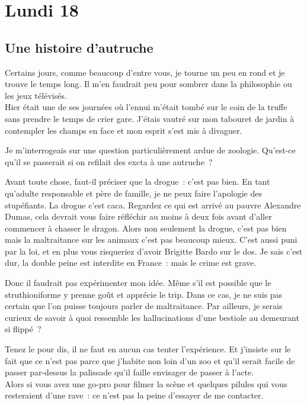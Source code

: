 ﻿\section*{Lundi 18}
\subsection*{Une histoire d’autruche}


Certains jours, comme beaucoup d’entre vous, je tourne un peu en rond et je trouve le temps long. Il m’en faudrait peu pour sombrer dans la philosophie ou les jeux télévisés. \\
Hier était une de ses journées où l’ennui m’était tombé sur le coin de la truffe sans prendre le temps de crier gare. J’étais vautré sur mon tabouret de jardin à contempler les champs en face et mon esprit s’est mis à divaguer.

Je m’interrogeais sur une question particulièrement ardue de zoologie. Qu’est-ce qu’il se passerait si on refilait des excta à une autruche ? 

Avant toute chose, faut-il préciser que la drogue : c’est pas bien. En tant qu’adulte responsable et père de famille, je ne peux faire l’apologie des stupéfiants. La drogue c’est caca. Regardez ce qui est arrivé au pauvre Alexandre Dumas, cela devrait vous faire réfléchir au moins à deux fois avant d’aller commencer à chasser le dragon.
Alors non seulement la drogue, c’est pas bien mais la maltraitance sur les animaux c’est pas beaucoup mieux. C’est aussi puni par la loi, et en plus vous risqueriez d’avoir Brigitte Bardo sur le dos. Je sais c’est dur, la double peine est interdite en France : mais le crime est grave.

Donc il faudrait pas expérimenter mon idée. Même s’il est possible que le struthioniforme y prenne goût et apprécie le trip. Dans ce cas, je ne suis pas certain que l’on puisse toujours parler de maltraitance. Par ailleurs, je serais curieux de savoir à quoi ressemble les hallucinations d’une bestiole au demeurant si flippé ? 

Tenez le pour dis, il ne faut en aucun cas tenter l’expérience. Et j’insiste sur le fait que ce n’est pas parce que j’habite non loin d’un zoo et qu’il serait facile de passer par-dessus la palissade qu’il faille envisager de passer à l’acte. \\ 
Alors si vous avez une go-pro pour filmer la scène et quelques pilules qui vous resteraient d’une rave : ce n’est pas la peine d’essayer de me contacter. 




